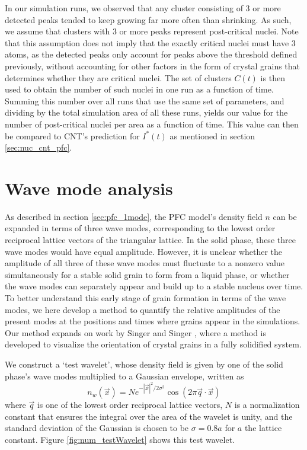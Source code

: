In our simulation runs, we observed that any cluster consisting of 3 or more detected peaks tended to keep growing far more often than shrinking. As such, we assume that clusters with 3 or more peaks represent post-critical nuclei. Note that this assumption does not imply that the exactly critical nuclei must have 3 atoms, as the detected peaks only account for peaks above the threshold defined previously, without accounting for other factors in the form of crystal grains that determines whether they are critical nuclei. The set of clusters $C(t)$ is then used to obtain the number of such nuclei in one run as a function of time. Summing this number over all runs that use the same set of parameters, and dividing by the total simulation area of all these runs, yields our value for the number of post-critical nuclei per area as a function of time. This value can then be compared to CNT's prediction for $I^*(t)$ as mentioned in section \ref{sec:nuc_cnt_pfc}.




\section{Wave mode analysis}\label{sec:num_wave}

As described in section \ref{sec:pfc_1mode}, the PFC model's density field $n$ can be expanded in terms of three wave modes, corresponding to the lowest order reciprocal lattice vectors of the triangular lattice. In the solid phase, these three wave modes would have equal amplitude. However, it is unclear whether the amplitude of all three of these wave modes must fluctuate to a nonzero value simultaneously for a stable solid grain to form from a liquid phase, or whether the wave modes can separately appear and build up to a stable nucleus over time. To better understand this early stage of grain formation in terms of the wave modes, we here develop a method to quantify the relative amplitudes of the present modes at the positions and times where grains appear in the simulations. Our method expands on work by Singer and Singer \cite{singer06}, where a method is developed to visualize the orientation of crystal grains in a fully solidified system.

We construct a `test wavelet', whose density field is given by one of the solid phase's wave modes multiplied to a Gaussian envelope, written as
\begin{equation}
n_{w}(\vec{x}) = Ne^{-|\vec{x}|^2/2\sigma^2}\cos(2\pi \vec{q}\cdot\vec{x})
\end{equation}
where $\vec{q}$ is one of the lowest order reciprocal lattice vectors, $N$ is a normalization constant that ensures the integral over the area of the wavelet is unity, and the standard deviation of the Gaussian is chosen to be $\sigma=0.8a$ for $a$ the lattice constant. Figure \ref{fig:num_testWavelet} shows this test wavelet.


